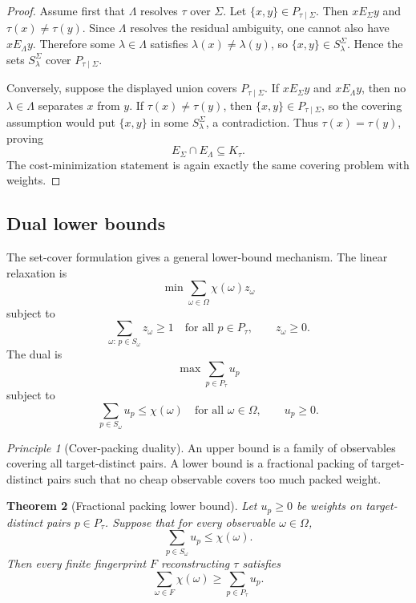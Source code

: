 \documentclass[11pt]{article}
\newtheorem{theorem}{Theorem}[section]
\theoremstyle{definition}
\theoremstyle{remark}
\newtheorem{principle}[theorem]{Principle}
\begin{document}
\begin{proof}
Assume first that \(\Lambda\) resolves \(\tau\) over \(\Sigma\).  Let \(\{x,y\}\in P_{\tau\mid\Sigma}\).  Then \(xE_\Sigma y\) and \(\tau(x)\neq\tau(y)\).  Since \(\Lambda\) resolves the residual ambiguity, one cannot also have \(xE_\Lambda y\).  Therefore some \(\lambda\in\Lambda\) satisfies \(\lambda(x)\neq\lambda(y)\), so \(\{x,y\}\in S_\lambda^\Sigma\).  Hence the sets \(S_\lambda^\Sigma\) cover \(P_{\tau\mid\Sigma}\).

Conversely, suppose the displayed union covers \(P_{\tau\mid\Sigma}\).  If \(xE_\Sigma y\) and \(xE_\Lambda y\), then no \(\lambda\in\Lambda\) separates \(x\) from \(y\).  If \(\tau(x)\neq\tau(y)\), then \(\{x,y\}\in P_{\tau\mid\Sigma}\), so the covering assumption would put \(\{x,y\}\) in some \(S_\lambda^\Sigma\), a contradiction.  Thus \(\tau(x)=\tau(y)\), proving
\[
E_\Sigma\cap E_\Lambda\subseteq K_\tau.
\]
The cost-minimization statement is again exactly the same covering problem with weights.
\end{proof}

\subsection{Dual lower bounds}

The set-cover formulation gives a general lower-bound mechanism.  The linear relaxation is
\[
\min\sum_{\omega\in\Omega}\chi(\omega)z_\omega
\]
subject to
\[
\sum_{\omega:\,p\in S_\omega}z_\omega\geq 1
\quad\text{for all }p\in P_\tau,\qquad
z_\omega\geq 0.
\]
The dual is
\[
\max\sum_{p\in P_\tau}u_p
\]
subject to
\[
\sum_{p\in S_\omega}u_p\leq \chi(\omega)
\quad\text{for all }\omega\in\Omega,\qquad
u_p\geq 0.
\]

\begin{principle}[Cover-packing duality]
An upper bound is a family of observables covering all target-distinct pairs.  A lower bound is a fractional packing of target-distinct pairs such that no cheap observable covers too much packed weight.
\end{principle}

\begin{theorem}[Fractional packing lower bound]
Let \(u_p\geq0\) be weights on target-distinct pairs \(p\in P_\tau\).  Suppose that for every observable \(\omega\in\Omega\),
\[
\sum_{p\in S_\omega}u_p\leq \chi(\omega).
\]
Then every finite fingerprint \(F\) reconstructing \(\tau\) satisfies
\[
\sum_{\omega\in F}\chi(\omega)\geq \sum_{p\in P_\tau}u_p.
\]
\end{theorem}
\end{document}
